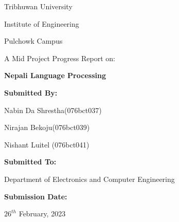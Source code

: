 \bigskip
\bigskip
\bigskip
\bigskip

\begin{center}

Tribhuwan University

Institute of Engineering

Pulchowk Campus

\bigskip
\bigskip
\bigskip
\bigskip
\bigskip
\bigskip
\bigskip
\bigskip

\noindent\makebox[\linewidth]
{\rule{15cm}{0.4pt}}
A Mid Project Progress Report on:

\textbf{\large Nepali Language Processing}
\noindent\makebox[\linewidth]
{\rule{15cm}{0.4pt}}

\bigskip
\bigskip
\bigskip
\bigskip
\bigskip
\bigskip
\bigskip
\bigskip
\textbf{Submitted By:}

Nabin Da Shrestha(076bct037)

Nirajan Bekoju(076bct039)

Nishant Luitel (076bct041)

\bigskip
\bigskip
\bigskip
\bigskip
\textbf{Submitted To:}

Department of Electronics and Computer Engineering

\bigskip
\bigskip
\bigskip
\bigskip
\textbf{Submission Date:} 

$26^{th}$ February, 2023

\end{center}
